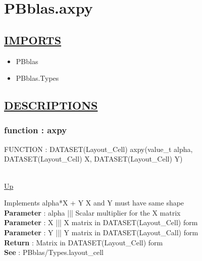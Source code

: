 \chapter*{PBblas.axpy}
\hypertarget{PBblas.axpy}{}

\section*{\underline{IMPORTS}}
\begin{itemize}
\item PBblas
\item PBblas.Types
\end{itemize}

\section*{\underline{DESCRIPTIONS}}
\subsection*{function : axpy}
\hypertarget{ecldoc:pbblas.axpy}{FUNCTION : DATASET(Layout\_Cell) axpy(value\_t alpha, DATASET(Layout\_Cell) X, DATASET(Layout\_Cell) Y)} \\
\hyperlink{ecldoc:}{Up} \\
\par
Implements alpha*X + Y X and Y must have same shape \\
\textbf{Parameter} : alpha ||| Scalar multiplier for the X matrix \\
\textbf{Parameter} : X ||| X matrix in DATASET(Layout\_Cell) form \\
\textbf{Parameter} : Y ||| Y matrix in DATASET(Layout\_Call) form \\
\textbf{Return} : Matrix in DATASET(Layout\_Cell) form \\
\textbf{See} : PBblas/Types.layout\_cell \\
